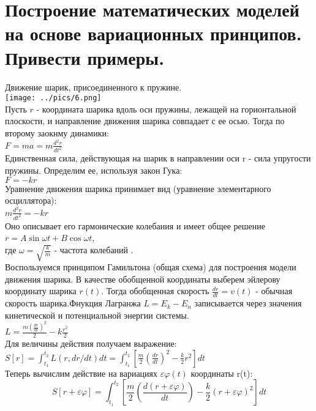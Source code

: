 \documentclass[12pt,a4paper]{article}
\begin{document}
	
	\section{Построение математических моделей на основе вариационных принципов. Привести примеры.}
	Движение шарик, присоединенного к пружине.\\
	\texttt{[image: ../pics/6.png]}\\
	Пусть $r$ - координата шарика вдоль оси пружины, лежащей на горионтальной плоскости, и направление движения шарика совпадает с ее осью. Тогда по второму заокнму динамики:\\
	$F = m a = m \displaystyle\frac{d^2r}{dt^2}$\\
	Единственная сила, действующая на шарик в направлении оси r - сила упругости пружины. Определим ее, используя закон Гука:\\
	$F = -kr$\\
	Уравнение движения шарика принимает вид (уравнение элементарного осциллятора):\\
	$m\displaystyle\frac{d^2r}{dt^2} = -kr$\\
	Оно описывает его гармонические колебания и имеет общее решение \\
	$r = A \sin \omega t + B \cos \omega t$,\\
	где $\omega = \sqrt{\displaystyle\frac{k}{m}} $ - частота колебаний . \\
	Воспользуемся принципом Гамильтона (общая схема) для построения модели движения шарика. В качестве обобщенной координаты выберем эйлерову координату шарика $r(t)$. Тогда обобщенная скорость $\frac{dr}{dt} = v(t)$ - обычная скорость шарика.Фнукция Лагранжа $ L = E_k - E_n $ записывается через значения кинетической и потенциальной энергии системы. \\
	$L = \displaystyle\frac{m(\displaystyle\frac{dr}{dt})^2}{2} - k\displaystyle\frac{r^2}{2}$\\
	Для величины действия получаем выражение:\\
	$S[r] = \displaystyle\int_{t_1}^{t_2} L(r, dr/dt) dt = \displaystyle\int_{t_1}^{t_2}[\displaystyle\frac{m}{2}(\displaystyle\frac{dr}{dt})^2 - \displaystyle\frac{k}{2}r^2] dt $\\
	Теперь вычислим действие на вариациях $\varepsilon\varphi(t)$ координаты r(t):\\
	\begin{equation*}
	S[r+\varepsilon\varphi] = \int_{t_1}^{t_2}\left[\frac{m}{2}(\frac{d(r+\varepsilon\varphi)}{dt}) - \frac{k}{2}(r+\varepsilon\varphi)^2\right]dt
	\end{equation*}
\end{document}
